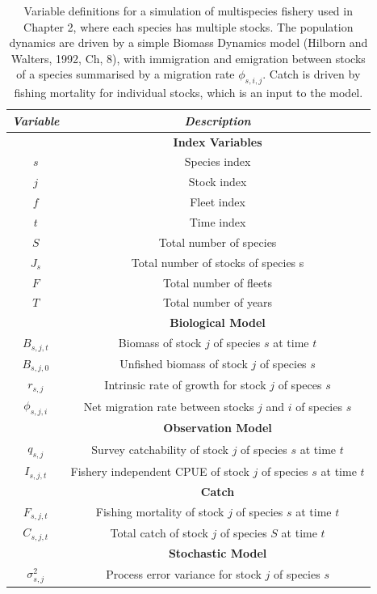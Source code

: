 \documentclass[]{scrartcl}
\begin{document}
\begin{table}[htbp]
\begin{center}
\caption{Variable definitions for a simulation of multispecies fishery used in Chapter 2, where each species has multiple stocks. The population dynamics are driven by a simple Biomass Dynamics model (Hilborn and Walters, 1992, Ch, 8), with immigration and emigration between stocks of a species summarised by a migration rate $\phi_{s,i,j}$. Catch is driven by fishing mortality for individual stocks, which is an input to the model.}\label{tab:OMspec}
\begin{tabular}{c|c}
\textit{Variable} & \textit{Description}  \\
\hline
& \textbf{ Index Variables} \\
\hline
$s$ & Species index \\
$j$ & Stock index \\
$f$ & Fleet index \\
$t$ & Time index \\
$S$ & Total number of species \\
$J_s$ & Total number of stocks of species s \\
$F$ & Total number of fleets \\
$T$ & Total number of years \\
\hline
& \textbf{ Biological Model} \\
\hline
$B_{s,j,t}$ & Biomass of stock $j$ of species $s$ at time $t$ \\
$B_{s,j,0}$ & Unfished biomass of stock $j$ of species $s$ \\
$r_{s,j}$ & Intrinsic rate of growth for stock $j$ of speces $s$ \\
$\phi_{s,j,i}$ &  Net migration rate between stocks $j$ and $i$ of species $s$ \\
\hline
& \textbf{ Observation Model} \\
\hline
$q_{s,j}$ & Survey catchability of stock $j$ of species $s$ at time $t$ \\
$I_{s,j,t}$ & Fishery independent CPUE of stock $j$ of species $s$ at time $t$ \\
\hline
& \textbf{ Catch} \\
\hline
$F_{s,j,t}$ & Fishing mortality of stock $j$ of species $s$ at time $t$ \\
$C_{s,j,t}$ & Total catch of stock $j$ of species $S$ at time $t$ \\
\hline
& \textbf{ Stochastic Model } \\
$\sigma_{s,j}^2$ & Process error variance for stock $j$ of species $s$ \\

\end{tabular}
\end{center}
\end{table}
\end{document}
